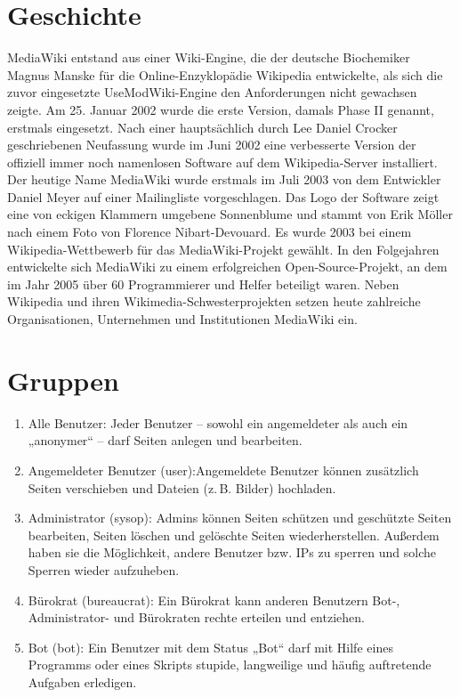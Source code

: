 \documentclass[12pt]{report}
\begin{document}
\section{Geschichte}
MediaWiki entstand aus einer Wiki-Engine, die der deutsche Biochemiker Magnus Manske für die Online-Enzyklopädie Wikipedia entwickelte, als sich die zuvor eingesetzte UseModWiki-Engine den Anforderungen nicht gewachsen zeigte. Am 25. Januar 2002 wurde die erste Version, damals Phase II genannt, erstmals eingesetzt. Nach einer hauptsächlich durch Lee Daniel Crocker geschriebenen Neufassung wurde im Juni 2002 eine verbesserte Version der offiziell immer noch namenlosen Software auf dem Wikipedia-Server installiert. Der heutige Name MediaWiki wurde erstmals im Juli 2003 von dem Entwickler Daniel Meyer auf einer Mailingliste vorgeschlagen. Das Logo der Software zeigt eine von eckigen Klammern umgebene Sonnenblume und stammt von Erik Möller nach einem Foto von Florence Nibart-Devouard. Es wurde 2003 bei einem Wikipedia-Wettbewerb für das MediaWiki-Projekt gewählt. In den Folgejahren entwickelte sich MediaWiki zu einem erfolgreichen Open-Source-Projekt, an dem im Jahr 2005 über 60 Programmierer und Helfer beteiligt waren. Neben Wikipedia und ihren Wikimedia-Schwesterprojekten setzen heute zahlreiche Organisationen, Unternehmen und Institutionen MediaWiki ein.
\section{Gruppen}
\begin{enumerate}
	\item Alle Benutzer:
	Jeder Benutzer – sowohl ein angemeldeter als auch ein „anonymer“ – darf Seiten anlegen und bearbeiten.
	\item Angemeldeter Benutzer (user):Angemeldete Benutzer können zusätzlich Seiten verschieben und Dateien (z. B. Bilder) hochladen.
	\item Administrator (sysop): Admins können Seiten schützen und geschützte Seiten bearbeiten, Seiten löschen und gelöschte Seiten wiederherstellen. Außerdem haben sie die Möglichkeit, andere Benutzer bzw. IPs zu sperren und solche Sperren wieder aufzuheben.
	\item Bürokrat (bureaucrat): Ein Bürokrat kann anderen Benutzern Bot-, Administrator- und Bürokraten rechte erteilen und entziehen.
	\item Bot (bot): Ein Benutzer mit dem Status „Bot“ darf mit Hilfe eines Programms oder eines Skripts stupide, langweilige und häufig auftretende Aufgaben erledigen.
\end{enumerate}
\end{document}
